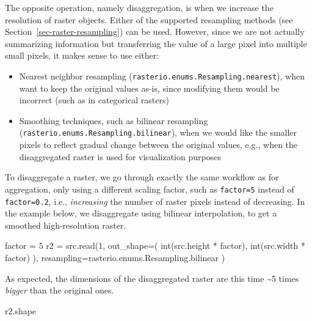 \documentclass[
  letterpaper,
]{krantz}
\newenvironment{Shaded}{\begin{snugshade}}{\end{snugshade}}
\newcommand{\BuiltInTok}[1]{\textcolor[rgb]{0.00,0.23,0.31}{#1}}
\newcommand{\DecValTok}[1]{\textcolor[rgb]{0.68,0.00,0.00}{#1}}
\newcommand{\NormalTok}[1]{\textcolor[rgb]{0.00,0.23,0.31}{#1}}
\newcommand{\OperatorTok}[1]{\textcolor[rgb]{0.37,0.37,0.37}{#1}}
\providecommand{\tightlist}{%
  \setlength{\itemsep}{0pt}\setlength{\parskip}{0pt}}\usepackage{longtable,booktabs,array}
\begin{document}
The opposite operation, namely disaggregation, is when we increase the
resolution of raster objects. Either of the supported resampling methods
(see Section~\ref{sec-raster-resampling}) can be used. However, since we
are not actually summarizing information but transferring the value of a
large pixel into multiple small pixels, it makes sense to use either:

\begin{itemize}
\tightlist
\item
  Nearest neighbor resampling
  (\texttt{rasterio.enums.Resampling.nearest}), when want to keep the
  original values as-is, since modifying them would be incorrect (such
  as in categorical rasters)
\item
  Smoothing techniques, such as bilinear resampling
  (\texttt{rasterio.enums.Resampling.bilinear}), when we would like the
  smaller pixels to reflect gradual change between the original values,
  e.g., when the disaggregated raster is used for visualization purposes
\end{itemize}

To disaggregate a raster, we go through exactly the same workflow as for
aggregation, only using a different scaling factor, such as
\texttt{factor=5} instead of \texttt{factor=0.2}, i.e.,
\emph{increasing} the number of raster pixels instead of decreasing. In
the example below, we disaggregate using bilinear interpolation, to get
a smoothed high-resolution raster.

\begin{Shaded}
\begin{Highlighting}[]
\NormalTok{factor }\OperatorTok{=} \DecValTok{5}
\NormalTok{r2 }\OperatorTok{=}\NormalTok{ src.read(}\DecValTok{1}\NormalTok{,}
\NormalTok{    out\_shape}\OperatorTok{=}\NormalTok{(}
        \BuiltInTok{int}\NormalTok{(src.height }\OperatorTok{*}\NormalTok{ factor),}
        \BuiltInTok{int}\NormalTok{(src.width }\OperatorTok{*}\NormalTok{ factor)}
\NormalTok{        ),}
\NormalTok{    resampling}\OperatorTok{=}\NormalTok{rasterio.enums.Resampling.bilinear}
\NormalTok{)}
\end{Highlighting}
\end{Shaded}

As expected, the dimensions of the disaggregated raster are this time
\textasciitilde5 times \emph{bigger} than the original ones.

\begin{Shaded}
\begin{Highlighting}[]
\NormalTok{r2.shape}
\end{Highlighting}
\end{Shaded}
\end{document}

